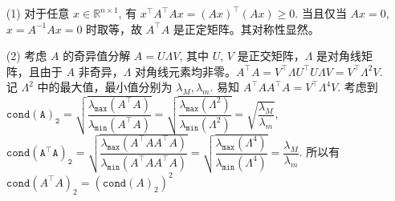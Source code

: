 \documentclass{article}
\begin{document}
\begin{spacing}{1.5}
\begin{itemize}
    \begin{itemize}
        \item [(1)] 对于任意 $x\in \mathbb{R}^{n\times 1}$, 有 $x^\top A^\top Ax = (Ax)^\top (Ax) \geq 0$. 当且仅当 $Ax = 0$, $x = A^{-1}Ax = 0$ 时取等，故 $A^\top A$ 是正定矩阵。其对称性显然。
        \item [(2)] 考虑 $A$ 的奇异值分解 $A = U\Lambda V$, 其中 $U$, $V$ 是正交矩阵，$\Lambda$ 是对角线矩阵，且由于 $A$ 非奇异，$\Lambda$ 对角线元素均非零。$A^\top A = V^\top \Lambda U^\top U\Lambda V = V^\top\Lambda^2 V$. 记 $\Lambda^2$ 中的最大值，最小值分别为 $\lambda_M,\lambda_m$. 易知 $A^\top AA^\top A = V^\top \Lambda^4 V$. 考虑到 $\mathtt{cond(A)_2} = \sqrt{\dfrac{\lambda_{\mathtt{max}}(A^\top A)}{\lambda_{\mathtt{min}}(A^\top A)}} = \sqrt{\dfrac{\lambda_{\mathtt{max}}(\Lambda^2)}{\lambda_{\mathtt{min}}(\Lambda^2)}}  = \sqrt{\dfrac{\lambda_M}{\lambda_m}}$, $\mathtt{cond(A^\top A)_2} = \sqrt{\dfrac{\lambda_{\mathtt{max}}(A^\top AA^\top A)}{\lambda_{\mathtt{min}}(A^\top AA^\top A)}} = \sqrt{\dfrac{\lambda_{\mathtt{max}}(\Lambda^4)}{\lambda_{\mathtt{min}}(\Lambda^4)}} = \dfrac{\lambda_M}{\lambda_m}$. 所以有 $\mathtt{cond}(A^\top A)_2 = \left(\mathtt{cond}(A)_2\right)^2$
    \end{itemize}

\end{itemize}
    
\end{spacing}
\end{document}
